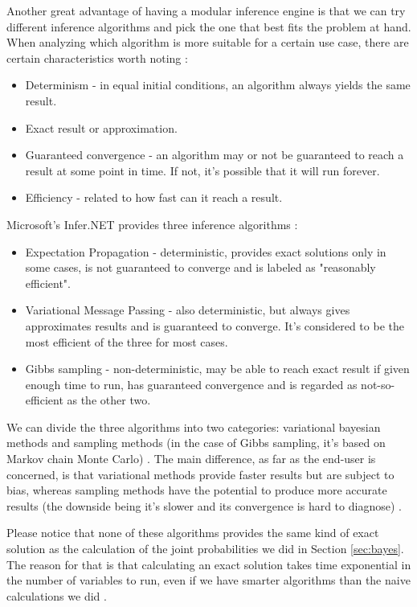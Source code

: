 Another great advantage of having a modular inference engine is that we can
try different inference algorithms and pick the one that best fits the problem
at hand. When analyzing which algorithm is more suitable for a certain use case, there are certain
characteristics worth noting \cite{Minka1999}:

\begin{itemize}
  \item Determinism - in equal initial conditions, an algorithm always yields
the same result.
  \item Exact result or approximation.
  \item Guaranteed convergence - an algorithm may or not be guaranteed to reach
a result at some point in time. If not, it's possible that it will run forever.
  \item Efficiency - related to how fast can it reach a result.
\end{itemize}

Microsoft's Infer.NET provides three inference algorithms \cite{msalg}:

\begin{itemize}
  \item Expectation Propagation - deterministic, provides exact solutions only
in some cases, is not guaranteed to converge and is labeled as "reasonably
efficient".
  \item Variational Message Passing - also deterministic, but always gives
approximates results and is guaranteed to converge. It's considered to be the
most efficient of the three for most cases.
  \item Gibbs sampling - non-deterministic, may be able to reach exact result
if given enough time to run, has guaranteed convergence and is regarded as
not-so-efficient as the other two.
\end{itemize}

We can divide the three algorithms into two categories: variational bayesian
methods \cite{Winn2005}\cite{Minka1999} and sampling methods (in the case of Gibbs
sampling, it's based on Markov chain Monte Carlo) \cite{Andrieu2003}. The main
difference, as far as the end-user is concerned, is that variational methods
provide faster results but are subject to bias, whereas sampling methods have
the potential to produce more accurate results (the downside being it's slower
and its convergence is hard to diagnose) \cite{Shen2010}.

Please notice that none of these algorithms provides the same kind of exact
solution as the calculation of the joint probabilities we did in Section
\ref{sec:bayes}. The reason for that is that calculating an exact solution
takes time exponential in the number of variables to run, even if we have smarter
algorithms than the naive calculations we did \cite{Zhang1994}.

